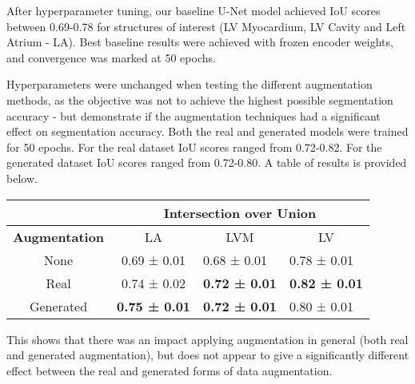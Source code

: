 After hyperparameter tuning, our baseline U-Net model achieved IoU scores
between 0.69-0.78 for structures of interest (LV Myocardium, LV Cavity and Left
Atrium - LA). Best baseline results were achieved with frozen encoder weights,
and convergence was marked at 50 epochs.  \newline

Hyperparameters were unchanged when testing the different augmentation methods,
as the objective was not to achieve the highest possible segmentation accuracy -
but demonstrate if the augmentation techniques had a significant effect on
segmentation accuracy. Both the real and generated models were trained for 50
epochs. For the real dataset IoU scores ranged from 0.72-0.82. For the generated
dataset IoU scores ranged from 0.72-0.80. A table of results is provided below.
\newline

\begin{table}[H]
    \centering
    \begin{tabular}{c|c|l|l|}
        \cline{2-4}
        \multicolumn{1}{l|}{}                       & \multicolumn{3}{c|}{\textbf{Intersection over Union}}                     \\ \hline
        \multicolumn{1}{|l|}{\textbf{Augmentation}} & LA                   & \multicolumn{1}{c|}{LVM} & \multicolumn{1}{c|}{LV} \\ \hline
        \multicolumn{1}{|c|}{None}                  & 0.69 ± 0.01          & 0.68 ± 0.01              & 0.78 ± 0.01             \\ \hline
        \multicolumn{1}{|c|}{Real}                  & 0.74 ± 0.02          & \textbf{0.72 ± 0.01}     & \textbf{0.82 ± 0.01}    \\ \hline
        \multicolumn{1}{|c|}{Generated}             & \textbf{0.75 ± 0.01} & \textbf{0.72 ± 0.01}     & 0.80 ± 0.01             \\ \hline
    \end{tabular}
\end{table}

This shows that there was an impact applying augmentation in general (both real
and generated augmentation), but does not appear to give a significantly
different effect between the real and generated forms of data augmentation.
\newline